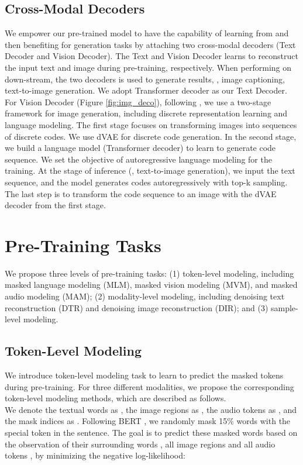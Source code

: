 \documentclass[10pt,twocolumn,letterpaper]{article}
\begin{document}
\subsection{Cross-Modal Decoders}  \label{sec:dec}
We empower our pre-trained model to have the capability of learning from and then benefiting for generation tasks by attaching two cross-modal decoders (\ie Text Decoder and Vision Decoder). The Text and Vision Decoder learns to reconstruct the input text and image during pre-training, respectively. When performing on down-stream, the two decoders is used to generate results, \eg, image captioning, text-to-image generation. We adopt Transformer decoder \cite{vaswani2017attention} as our Text Decoder. For Vision Decoder (Figure \ref{fig:img_deco}), following \cite{dalle}, we use a two-stage framework for image generation, including discrete representation learning and language modeling. The first stage focuses on transforming images into sequences of discrete codes. We use dVAE \cite{dalle} for discrete code generation. In the second stage, we build a language model (\ie Transformer decoder) to learn to generate code sequence. We set the objective of autoregressive language modeling for the training. At the stage of inference (\eg, text-to-image generation), we input the text sequence, and the model generates codes autoregressively with top-k sampling. The last step is to transform the code sequence to an image with the dVAE decoder from the first stage.

\section{Pre-Training Tasks}
We propose three levels of pre-training tasks: (1) token-level modeling, including masked language modeling (MLM), masked vision modeling (MVM), and masked audio modeling (MAM); (2) modality-level modeling, including denoising text reconstruction (DTR) and denoising image reconstruction (DIR); and (3) sample-level modeling.

\subsection{Token-Level Modeling}
We introduce token-level modeling task to learn to predict the masked tokens during pre-training. For three different modalities, we propose the corresponding token-level modeling methods, which are described as follows. \\

 We denote the textual words as , the image regions as , the audio tokens as , and the mask indices as . Following BERT \cite{bert}, we randomly mask 15\% words with the special token  in the sentence. The goal is to predict these masked words based on the observation of their surrounding words , all image regions  and all audio tokens , by minimizing the negative log-likelihood:
  
\end{document}
